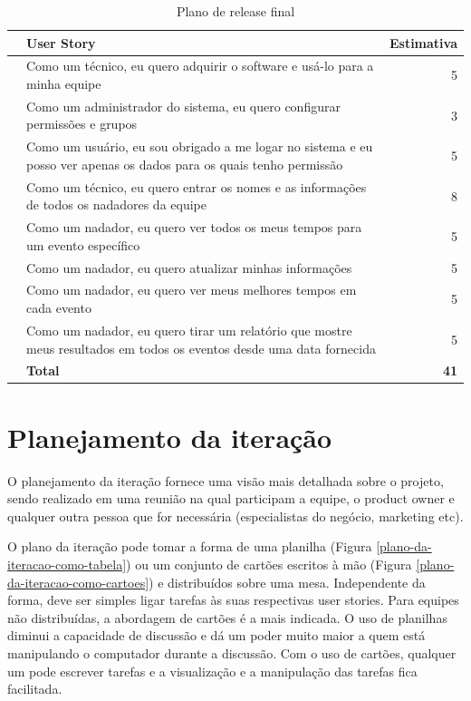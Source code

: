 \documentclass[a4paper,abntfigtabnum,noindentfirst]{abnt}
\begin{document}
\begin{table}
  \caption{Plano de release final}
  \label{plano-de-release-final}
  \begin{center}
    \begin{tabular}{clr}
      \hline
      &\textbf{User Story}&\textbf{Estimativa}\\
      \hline
      &Como um técnico, eu quero adquirir o software e usá-lo para a minha equipe&5\\
      &Como um administrador do sistema, eu quero configurar permissões e grupos&3\\
      &Como um usuário, eu sou obrigado a me logar no sistema e eu posso ver apenas os dados para os quais tenho permissão&5\\
      &Como um técnico, eu quero entrar os nomes e as informações de todos os nadadores da equipe&8\\
      &Como um nadador, eu quero ver todos os meus tempos para um evento específico&5\\
      &Como um nadador, eu quero atualizar minhas informações&5\\
      &Como um nadador, eu quero ver meus melhores tempos em cada evento&5\\
      &Como um nadador, eu quero tirar um relatório que mostre meus resultados em todos os eventos desde uma data fornecida&5\\
      \hline
      &\textbf{Total}&\textbf{41}\\
      \hline
    \end{tabular}
  \end{center}
\end{table}


\chapter{Planejamento da iteração}

O planejamento da iteração fornece uma visão mais detalhada sobre o projeto, sendo realizado em uma reunião na qual participam a equipe, o product owner e qualquer outra pessoa que for necessária (especialistas do negócio, marketing etc). 

O plano da iteração pode tomar a forma de uma planilha (Figura \ref{plano-da-iteracao-como-tabela}) ou um conjunto de cartões escritos à mão (Figura \ref{plano-da-iteracao-como-cartoes}) e distribuídos sobre uma mesa. Independente da forma, deve ser simples ligar tarefas às suas respectivas user stories. Para equipes não distribuídas, a abordagem de cartões é a mais indicada. O uso de planilhas diminui a capacidade de discussão e dá um poder muito maior a quem está manipulando o computador durante a discussão. Com o uso de cartões, qualquer um pode escrever tarefas e a visualização e a manipulação das tarefas fica facilitada.
\end{document}
